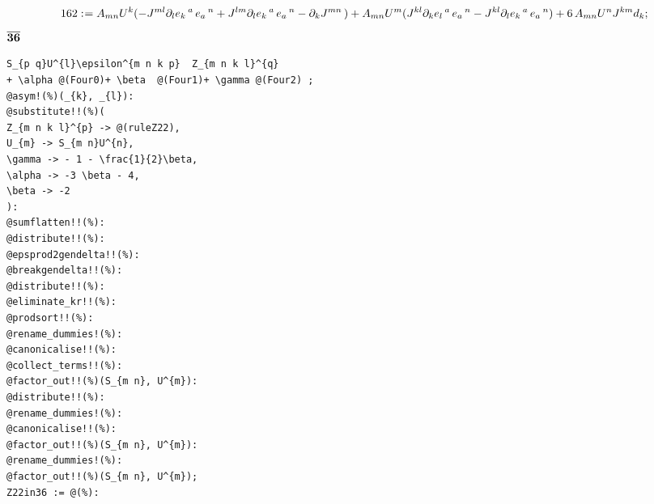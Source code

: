 \documentclass[11pt]{article}
\def\specialcolon{\mathrel{\mathop{:}}\hspace{-.5em}}
\renewcommand{\bar}[1]{\overline{#1}}
\begin{document}
\begin{dmath*}[compact, spread=2pt]
162\specialcolon{}= {A}_{m n} {U}^{k} ( - {J}^{m l} {\partial}_{l}{{e}_{k}\,^{a}}\,  {e}_{a}\,^{n} + {J}^{l m} {\partial}_{l}{{e}_{k}\,^{a}}\,  {e}_{a}\,^{n} - {\partial}_{k}{{J}^{m n}}\, ) + {A}_{m n} {U}^{m} ({J}^{k l} {\partial}_{k}{{e}_{l}\,^{a}}\,  {e}_{a}\,^{n} - {J}^{k l} {\partial}_{l}{{e}_{k}\,^{a}}\,  {e}_{a}\,^{n}) + 6\, {A}_{m n} {U}^{n} {J}^{k m} {d}_{k};
\end{dmath*}
$\bf \bar{36}$
{\color[named]{Blue}\begin{verbatim}
S_{p q}U^{l}\epsilon^{m n k p}  Z_{m n k l}^{q} 
+ \alpha @(Four0)+ \beta  @(Four1)+ \gamma @(Four2) ;
@asym!(%)(_{k}, _{l}):
@substitute!!(%)(
Z_{m n k l}^{p} -> @(ruleZ22),
U_{m} -> S_{m n}U^{n},
\gamma -> - 1 - \frac{1}{2}\beta,
\alpha -> -3 \beta - 4,
\beta -> -2
):
@sumflatten!!(%):
@distribute!!(%):
@epsprod2gendelta!!(%):
@breakgendelta!!(%):
@distribute!!(%):
@eliminate_kr!!(%):
@prodsort!!(%):
@rename_dummies!(%):
@canonicalise!!(%):
@collect_terms!!(%):
@factor_out!!(%)(S_{m n}, U^{m}):
@distribute!!(%):
@rename_dummies!(%):
@canonicalise!!(%):
@factor_out!!(%)(S_{m n}, U^{m}):
@rename_dummies!(%):
@factor_out!!(%)(S_{m n}, U^{m});
Z22in36 := @(%):
\end{verbatim}}
\end{document}
